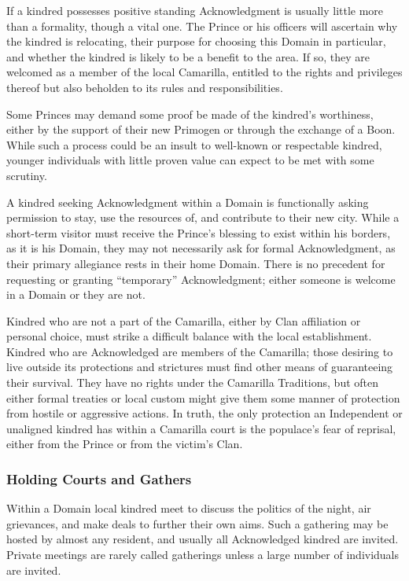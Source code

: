 If a kindred possesses positive standing Acknowledgment is usually little more 
than a formality, though a vital one.  The Prince or his officers will ascertain 
why the kindred is relocating, their purpose for choosing this Domain in particular, 
and whether the kindred is likely to be a benefit to the area.  If so, they are 
welcomed as a member of the local Camarilla, entitled to the rights and privileges 
thereof but also beholden to its rules and responsibilities.

Some Princes may demand some proof be made of the kindred's worthiness, either 
by the support of their new Primogen or through the exchange of a Boon.  While such 
a process could be an insult to well-known or respectable kindred, younger 
individuals with little proven value can expect to be met with some scrutiny.

A kindred seeking Acknowledgment within a Domain is functionally asking permission to 
stay, use the resources of, and contribute to their new city.  While a short-term 
visitor must receive the Prince's blessing to exist within his borders, as it is his 
Domain, they may not necessarily ask for formal Acknowledgment, as their primary 
allegiance rests in their home Domain.  There is no precedent for requesting or granting 
``temporary'' Acknowledgment; either someone is welcome in a Domain or they are not.

Kindred who are not a part of the Camarilla, either by Clan affiliation or personal 
choice, must strike a difficult balance with the local establishment.  Kindred who are 
Acknowledged are members of the Camarilla; those desiring to live outside its protections 
and strictures must find other means of guaranteeing their survival.  They have no rights 
under the Camarilla Traditions, but often either formal treaties or local custom might give 
them some manner of protection from hostile or aggressive actions.  In truth, the only 
protection an Independent or unaligned kindred has within a Camarilla court is the 
populace's fear of reprisal, either from the Prince or from the victim's Clan.

\subsubsection{Holding Courts and Gathers}
Within a Domain local kindred meet to discuss the politics of the night, air 
grievances, and make deals to further their own aims.  Such a gathering may be hosted 
by almost any resident, and usually all Acknowledged kindred are invited.  Private 
meetings are rarely called gatherings unless a large number of individuals are invited.

